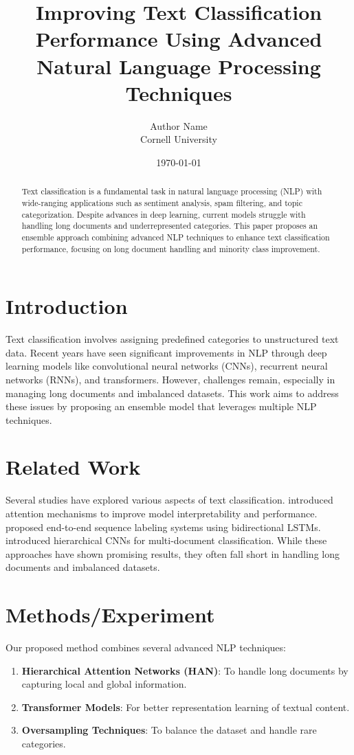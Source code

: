 \documentclass{article}
\title{Improving Text Classification Performance Using Advanced Natural Language Processing Techniques}
\author{Author Name \\ Cornell University}
\date{\today}
\begin{document}
\maketitle

\begin{abstract}
Text classification is a fundamental task in natural language processing (NLP) with wide-ranging applications such as sentiment analysis, spam filtering, and topic categorization. Despite advances in deep learning, current models struggle with handling long documents and underrepresented categories. This paper proposes an ensemble approach combining advanced NLP techniques to enhance text classification performance, focusing on long document handling and minority class improvement.
\end{abstract}

\section{Introduction}
Text classification involves assigning predefined categories to unstructured text data. Recent years have seen significant improvements in NLP through deep learning models like convolutional neural networks (CNNs), recurrent neural networks (RNNs), and transformers. However, challenges remain, especially in managing long documents and imbalanced datasets. This work aims to address these issues by proposing an ensemble model that leverages multiple NLP techniques.

\section{Related Work}
Several studies have explored various aspects of text classification. \cite{wang2017attention} introduced attention mechanisms to improve model interpretability and performance. \cite{ma2016end} proposed end-to-end sequence labeling systems using bidirectional LSTMs. \cite{yang2016hierarchical} introduced hierarchical CNNs for multi-document classification. While these approaches have shown promising results, they often fall short in handling long documents and imbalanced datasets.

\section{Methods/Experiment}
Our proposed method combines several advanced NLP techniques:
\begin{enumerate}
    \item \textbf{Hierarchical Attention Networks (HAN)}: To handle long documents by capturing local and global information.
    \item \textbf{Transformer Models}: For better representation learning of textual content.
    \item \textbf{Oversampling Techniques}: To balance the dataset and handle rare categories.
\end{enumerate}
\end{document}
